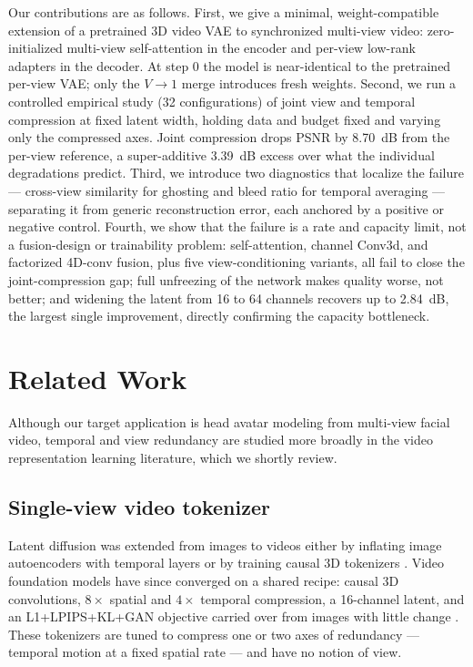 Our contributions are as follows.
First, we give a minimal, weight-compatible extension of a pretrained 3D video VAE to synchronized multi-view video: zero-initialized multi-view self-attention in the encoder and per-view low-rank adapters in the decoder. At step 0 the model is near-identical to the pretrained per-view VAE; only the $V{\to}1$ merge introduces fresh weights.
Second, we run a controlled empirical study (32 configurations) of joint view and temporal compression at fixed latent width, holding data and budget fixed and varying only the compressed axes. Joint compression drops PSNR by 8.70~dB from the per-view reference, a super-additive 3.39~dB excess over what the individual degradations predict.
Third, we introduce two diagnostics that localize the failure --- cross-view similarity for ghosting and bleed ratio for temporal averaging --- separating it from generic reconstruction error, each anchored by a positive or negative control.
Fourth, we show that the failure is a rate and capacity limit, not a fusion-design or trainability problem: self-attention, channel Conv3d, and factorized 4D-conv fusion, plus five view-conditioning variants, all fail to close the joint-compression gap; full unfreezing of the network makes quality worse, not better; and widening the latent from 16 to 64 channels recovers up to 2.84~dB, the largest single improvement, directly confirming the capacity bottleneck.


\section{Related Work}

Although our target application is head avatar modeling from multi-view facial video, temporal and view redundancy are studied more broadly in the video representation learning literature, which we shortly review.

\subsection{Single-view video tokenizer}

Latent diffusion \cite{rombach2022high} was extended from images to videos either by inflating image autoencoders with temporal layers \cite{blattmann2023align} or by training causal 3D tokenizers \cite{yu2024language}. Video foundation models have since converged on a shared recipe: causal 3D convolutions, $8\times$ spatial and $4\times$ temporal compression, a 16-channel latent, and an L1+LPIPS+KL+GAN objective \cite{esser2021taming} carried over from images with little change \cite{wan2025wan, yang2024cogvideox, kong2024hunyuanvideo, agarwal2025cosmos}. These tokenizers are tuned to compress one or two axes of redundancy --- temporal motion at a fixed spatial rate --- and have no notion of view.

